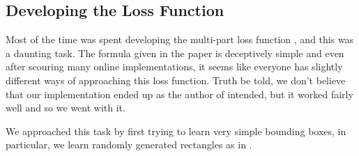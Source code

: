 \subsection{Developing the Loss Function}

Most of the time was spent developing the multi-part loss function \cite[Eq.3]{YOLO}, and this was a daunting task.
The formula given in the paper is deceptively simple and even after scouring many online implementations, it seems like everyone has slightly different ways of approaching this loss function.
Truth be told, we don't believe that our implementation ended up as the author of \cite{YOLO} intended, but it worked fairly well and so we went with it.

We approached this task by first trying to learn very simple bounding boxes, in particular, we learn randomly generated rectangles as in .


